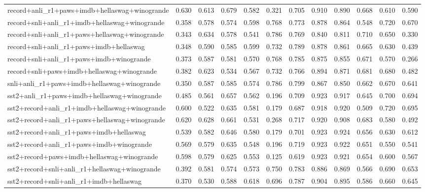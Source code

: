 \begin{table}[t]
\begin{tabular}{lrrrrrrrrrrr}
    record+anli\_r1+paws+imdb+hellaswag+winogrande & 0.630 & 0.613 & 0.679 & 0.582 & 0.321 & 0.705 & 0.910 & 0.890 & 0.668 & 0.610 & 0.590 \\
    record+snli+anli\_r1+imdb+hellaswag+winogrande & 0.358 & 0.578 & 0.574 & 0.598 & 0.768 & 0.773 & 0.878 & 0.864 & 0.548 & 0.720 & 0.670 \\
    record+snli+anli\_r1+paws+hellaswag+winogrande & 0.343 & 0.634 & 0.578 & 0.541 & 0.786 & 0.769 & 0.840 & 0.811 & 0.710 & 0.650 & 0.330 \\
    record+snli+anli\_r1+paws+imdb+hellaswag & 0.348 & 0.590 & 0.585 & 0.599 & 0.732 & 0.789 & 0.878 & 0.861 & 0.665 & 0.630 & 0.439 \\
    record+snli+anli\_r1+paws+imdb+winogrande & 0.373 & 0.587 & 0.581 & 0.570 & 0.768 & 0.785 & 0.875 & 0.855 & 0.671 & 0.570 & 0.266 \\
    record+snli+paws+imdb+hellaswag+winogrande & 0.382 & 0.623 & 0.534 & 0.567 & 0.732 & 0.766 & 0.894 & 0.871 & 0.681 & 0.680 & 0.482 \\
    snli+anli\_r1+paws+imdb+hellaswag+winogrande & 0.350 & 0.587 & 0.585 & 0.574 & 0.786 & 0.799 & 0.867 & 0.850 & 0.662 & 0.670 & 0.641 \\
    sst2+anli\_r1+paws+imdb+hellaswag+winogrande & 0.485 & 0.561 & 0.657 & 0.562 & 0.196 & 0.709 & 0.923 & 0.917 & 0.645 & 0.700 & 0.694 \\
    sst2+record+anli\_r1+imdb+hellaswag+winogrande & 0.600 & 0.522 & 0.635 & 0.581 & 0.179 & 0.687 & 0.918 & 0.920 & 0.509 & 0.720 & 0.695 \\
    sst2+record+anli\_r1+paws+hellaswag+winogrande & 0.620 & 0.628 & 0.661 & 0.531 & 0.268 & 0.717 & 0.920 & 0.908 & 0.683 & 0.580 & 0.492 \\
    sst2+record+anli\_r1+paws+imdb+hellaswag & 0.539 & 0.582 & 0.646 & 0.580 & 0.179 & 0.701 & 0.923 & 0.924 & 0.656 & 0.630 & 0.612 \\
    sst2+record+anli\_r1+paws+imdb+winogrande & 0.569 & 0.579 & 0.635 & 0.548 & 0.196 & 0.719 & 0.923 & 0.922 & 0.651 & 0.550 & 0.541 \\
    sst2+record+paws+imdb+hellaswag+winogrande & 0.598 & 0.579 & 0.625 & 0.553 & 0.125 & 0.619 & 0.923 & 0.921 & 0.654 & 0.600 & 0.567 \\
    sst2+record+snli+anli\_r1+hellaswag+winogrande & 0.392 & 0.581 & 0.574 & 0.573 & 0.750 & 0.783 & 0.886 & 0.869 & 0.566 & 0.690 & 0.653 \\
    sst2+record+snli+anli\_r1+imdb+hellaswag & 0.370 & 0.530 & 0.588 & 0.618 & 0.696 & 0.787 & 0.904 & 0.895 & 0.586 & 0.660 & 0.645 \\

\end{tabular}
\end{table}
